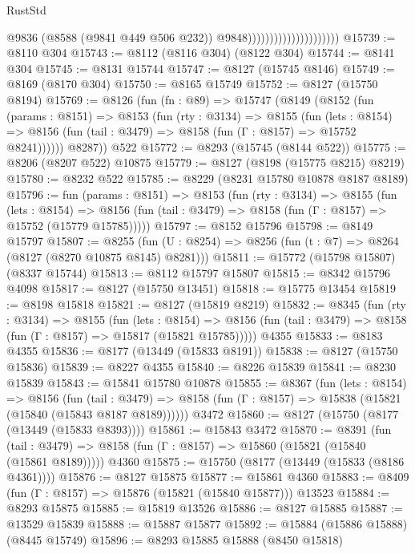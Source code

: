 \begin{lexlean}{RustStd}
\begin{coremodule}
                                              @9836
                                              (@8588 (@9841 @449 @506 @232))
                                              @9848)))))))))))))))))))))
@15739 := @8110 @304
@15743 := @8112 (@8116 @304) (@8122 @304)
@15744 := @8141 @304
@15745 := @8131 @15744
@15747 := @8127 (@15745 @8146)
@15749 := @8169 (@8170 @304)
@15750 := @8165 @15749
@15752 := @8127 (@15750 @8194)
@15769 := @8126
    (fun (fn : @89) =>
    @15747
      (@8149
        (@8152
          (fun (params : @8151) =>
          @8153
            (fun (rty : @3134) =>
            @8155
              (fun (lets : @8154) =>
              @8156 (fun (tail : @3479) => @8158 (fun (Γ : @8157) => @15752 @8241))))))
        @8287))
    @522
@15772 := @8293 (@15745 (@8144 @522))
@15775 := @8206 (@8207 @522) @10875
@15779 := @8127 (@8198 (@15775 @8215) @8219)
@15780 := @8232 @522
@15785 := @8229 (@8231 @15780 @10878 @8187 @8189)
@15796 := fun (params : @8151) =>
  @8153
    (fun (rty : @3134) =>
    @8155
      (fun (lets : @8154) =>
      @8156 (fun (tail : @3479) => @8158 (fun (Γ : @8157) => @15752 (@15779 @15785)))))
@15797 := @8152 @15796
@15798 := @8149 @15797
@15807 := @8255
    (fun (U : @8254) => @8256 (fun (t : @7) => @8264 (@8127 (@8270 @10875 @8145) @8281)))
@15811 := @15772 (@15798 @15807) (@8337 @15744)
@15813 := @8112 @15797 @15807
@15815 := @8342 @15796 @4098
@15817 := @8127 (@15750 @13451)
@15818 := @15775 @13454
@15819 := @8198 @15818
@15821 := @8127 (@15819 @8219)
@15832 := @8345
    (fun (rty : @3134) =>
    @8155
      (fun (lets : @8154) =>
      @8156 (fun (tail : @3479) => @8158 (fun (Γ : @8157) => @15817 (@15821 @15785)))))
    @4355
@15833 := @8183 @4355
@15836 := @8177 (@13449 (@15833 @8191))
@15838 := @8127 (@15750 @15836)
@15839 := @8227 @4355
@15840 := @8226 @15839
@15841 := @8230 @15839
@15843 := @15841 @15780 @10878
@15855 := @8367
    (fun (lets : @8154) =>
    @8156
      (fun (tail : @3479) =>
      @8158 (fun (Γ : @8157) => @15838 (@15821 (@15840 (@15843 @8187 @8189))))))
    @3472
@15860 := @8127 (@15750 (@8177 (@13449 (@15833 @8393))))
@15861 := @15843 @3472
@15870 := @8391
    (fun (tail : @3479) => @8158 (fun (Γ : @8157) => @15860 (@15821 (@15840 (@15861 @8189)))))
    @4360
@15875 := @15750 (@8177 (@13449 (@15833 (@8186 @4361))))
@15876 := @8127 @15875
@15877 := @15861 @4360
@15883 := @8409 (fun (Γ : @8157) => @15876 (@15821 (@15840 @15877))) @13523
@15884 := @8293 @15875
@15885 := @15819 @13526
@15886 := @8127 @15885
@15887 := @13529 @15839
@15888 := @15887 @15877
@15892 := @15884 (@15886 @15888) (@8445 @15749)
@15896 := @8293 @15885 @15888 (@8450 @15818)

\end{coremodule}
\end{lexlean}
